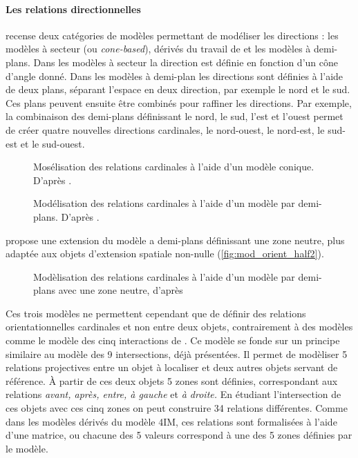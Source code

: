 \paragraph{Les relations directionnelles}

\textcite{Frank1992} recense deux catégories de modèles permettant de
modéliser les directions : les modèles à secteur (ou
\emph{cone-based}), dérivés du travail de \textcite{Peuquet1987} et
les modèles à demi-plans. Dans les modèles à secteur la direction est
définie en fonction d'un cône d'angle donné. Dans les modèles à
demi-plan les directions sont définies à l'aide de deux plans,
séparant l'espace en deux direction, par exemple le nord et le
sud. Ces plans peuvent ensuite être combinés pour raffiner les
directions. Par exemple, la combinaison des demi-plans définissant le
nord, le sud, l'est et l'ouest permet de créer quatre nouvelles
directions cardinales, le nord-ouest, le nord-est, le sud-est et le
sud-ouest.

\begin{figure}
  \centering
    
    \caption{Mosélisation des relations cardinales à l'aide d'un
      modèle conique. D'après \textcite{Renz2004}.}
  \label{fig:mod_orient_cone}
\end{figure}

\begin{figure}
  \centering
    
  \caption{Modélisation des relations cardinales à l'aide d'un modèle
    par demi-plans. D'après \textcite{Frank1992}.}
  \label{fig:mod_orient_half}
\end{figure}


\textcite{Frank1992} propose une extension du modèle a demi-plans
définissant une zone neutre, plus adaptée aux objets d'extension
spatiale non-nulle (\autoref{fig:mod_orient_half2}).

\begin{figure}
  \centering
    
  \caption{Modèlisation des relations cardinales à l'aide d'un modèle
    par demi-plans avec une zone neutre, d'après \textcite{Frank1992}}
  \label{fig:mod_orient_half2}
\end{figure}

Ces trois modèles ne permettent cependant que de définir des relations
orientationnelles cardinales et non entre deux objets, contrairement à
des modèles comme le modèle des cinq interactions de
\textcite{Clementini2006}. Ce modèle se fonde sur un principe
similaire au modèle des 9 intersections, déjà présentées. Il permet de
modèliser 5 relations projectives entre un objet à localiser et deux
autres objets servant de référence. À partir de ces deux objets 5
zones sont définies, correspondant aux relations \emph{avant, après,
  entre, à gauche} et \emph{à droite.} En étudiant l'intersection de
ces objets avec ces cinq zones on peut construire 34 relations
différentes. Comme dans les modèles dérivés du modèle 4IM, ces
relations sont formalisées à l'aide d'une matrice, ou chacune des 5
valeurs correspond à une des 5 zones définies par le modèle.

